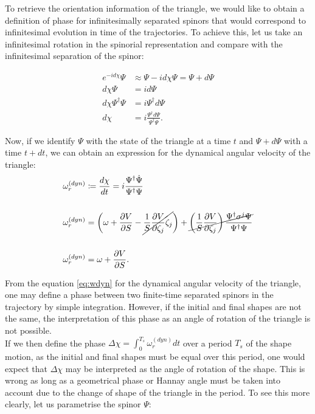 To retrieve the orientation information of the triangle, we would like to obtain a definition of phase for infinitesimally separated spinors that would correspond to infinitesimal evolution in time of the trajectories. To achieve this, let us take an infinitesimal rotation in the spinorial representation and compare with the infinitesimal separation of the spinor:

\begin{align*}
e^{-id\chi}\Psi &\approx \Psi -id\chi\Psi = \Psi + d\Psi\\
d\chi\Psi &= id\Psi \\
d\chi\Psi^\dagger\Psi &= i\Psi^\dagger d\Psi\\
d\chi &= i\frac{\Psi^\dagger d\Psi}{\Psi^\dagger\Psi}.
\end{align*}

Now, if we identify $\Psi$ with the state of the triangle at a time $t$ and $\Psi+d\Psi$ with a time $t+dt$, we can obtain an expression for the dynamical angular velocity of the triangle:\\

\begin{align}
\omega_r^{(dyn)} &\coloneqq \frac{d\chi}{dt} = i\frac{\Psi^\dagger\dot{\Psi}}{\Psi^\dagger\Psi}\nonumber\\
\nonumber\\
\omega_r^{(dyn)}&= \left( \omega +\frac{\partial V}{\partial S}-\cancel{\frac{1}{S}\frac{\partial V}{\partial \zeta_j}\zeta_j} \right) + \cancel{\left( \frac{1}{S}\frac{\partial V}{\partial \zeta_j} \right)\frac{ \Psi^\dagger \sigma^j\Psi}{\Psi^\dagger \Psi}}\nonumber\\
\nonumber\\
\omega_r^{(dyn)} &= \omega + \frac{\partial V}{\partial S}.
\label{eq:wdyn}
\end{align}

From the equation \eqref{eq:wdyn} for the dynamical angular velocity of the triangle, one may define a phase between two finite-time separated spinors in the trajectory by simple integration. However, if the initial and final shapes are not the same, the interpretation of this phase as an angle of rotation of the triangle is not possible.\\

If we then define the phase $\Delta \chi = \int_0^{T_s}\omega_r^{(dyn)}dt$ over a period $T_s$ of the shape motion, as the initial and final shapes must be equal over this period, one would expect that $\Delta \chi$ may be interpreted as the angle of rotation of the shape. This is wrong as long as a geometrical phase or Hannay angle \cite{hannay} must be taken into account due to the change of shape of the triangle in the period. To see this more clearly, let us parametrise the spinor $\Psi$:

